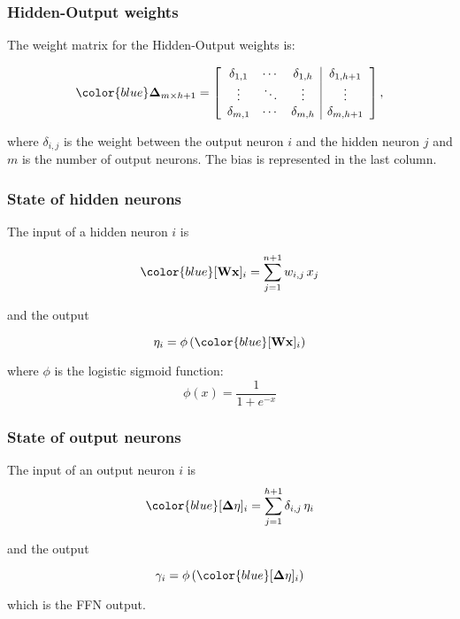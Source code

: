 \begin{frame}
  \frametitle{Hidden-Output weights}

The weight matrix for the Hidden-Output weights is:

  \[
    {\color{blue}
    \mathbf{\Delta}_{m \times h+1}} =
    \left[
      \begin{array}{ccc|c}
        \delta_{1,1} & \cdots & \delta_{1,h} & \delta_{1,h+1}\\
        \vdots & \ddots &  \vdots & \vdots\\
        \delta_{m,1} & \cdots & \delta_{m,h} &\delta_{m,h+1}
      \end{array}
    \right],
  \]

where $\delta_{i,j}$ is the weight between the output neuron $i$ and
the hidden neuron $j$ and $m$ is the number of output neurons. The
bias is represented in the last column.

\end{frame}

\begin{frame}
  \frametitle{State of hidden neurons}

The input of a hidden neuron $i$ is

\[   
     {\color{blue}[\mathbf{Wx}]_{i}}=
     \sum_{j=1}^{n+1}
      w_{i,j}\,x_j 
  \]

and the output 

\[
\eta_{i} = \phi \left(
{\color{blue}[\mathbf{Wx}]_{i}}
    \right)
\]

where $\phi$ is the logistic sigmoid function:
\[
\phi(x) = \frac{1}{1+e^{-x}}
\]

\end{frame}


\begin{frame}
  \frametitle{State of output neurons}

The input of an output neuron $i$ is
\[
    {\color{blue}[\mathbf{\Delta \eta}]_{i}} =
      \sum_{j=1}^{h+1}
      \delta_{i,j}\,\eta_i
  \]


and the output 

\[
\gamma_{i} = \phi \left(
    {\color{blue}[\mathbf{\Delta \eta}]_{i}} 
    \right)
\]

which is the FFN output.

\end{frame}

